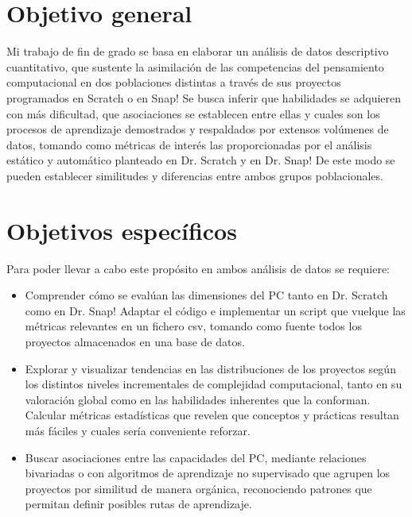 \documentclass[a4paper, 12pt]{book}
\begin{document}
\section{Objetivo general} 
\label{sec:objetivo-general} 

Mi trabajo de fin de grado se basa en elaborar un análisis de datos descriptivo cuantitativo, que sustente la asimilación de las competencias del pensamiento computacional en dos poblaciones distintas a través de sus proyectos programados en Scratch o en Snap! Se busca inferir que habilidades se adquieren con más dificultad, que asociaciones se establecen entre ellas y cuales son los procesos de aprendizaje demostrados y respaldados por extensos volúmenes de datos, tomando como métricas de interés las proporcionadas por el análisis estático y automático planteado en Dr. Scratch y en Dr. Snap! De este modo se pueden establecer similitudes y diferencias entre ambos grupos poblacionales.

\section{Objetivos específicos}
\label{sec:objetivos-especificos}

Para poder llevar a cabo este propósito en ambos análisis de datos se requiere:

\begin{itemize}
    \item Comprender cómo se evalúan las dimensiones del PC tanto en Dr. Scratch como en Dr. Snap! Adaptar el código e implementar un script que vuelque las métricas relevantes en un fichero csv, tomando como fuente todos los proyectos almacenados en una base de datos.
    \item Explorar y visualizar tendencias en las distribuciones de los proyectos según los distintos niveles incrementales de complejidad computacional, tanto en su valoración global como en las habilidades inherentes que la conforman. Calcular métricas estadísticas que revelen que conceptos y prácticas resultan más fáciles y cuales sería conveniente reforzar. 
    \item Buscar asociaciones entre las capacidades del PC, mediante relaciones bivariadas o con algoritmos de aprendizaje no supervisado que agrupen los proyectos por similitud de manera orgánica, reconociendo patrones que permitan definir posibles rutas de aprendizaje.
   
\end{itemize}
\end{document}
